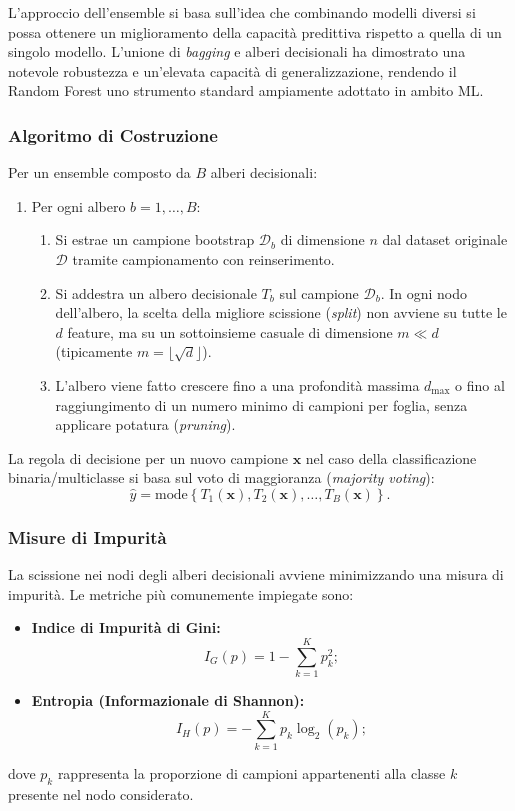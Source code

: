 L'approccio dell'ensemble si basa sull'idea che combinando modelli diversi si possa ottenere un miglioramento della capacità predittiva rispetto a quella di un singolo modello. L'unione di \textit{bagging} e alberi decisionali ha dimostrato una notevole robustezza e un'elevata capacità di generalizzazione, rendendo il Random Forest uno strumento standard ampiamente adottato in ambito ML.

\subsubsection{Algoritmo di Costruzione}
Per un ensemble composto da $B$ alberi decisionali:
\begin{enumerate}
    \item Per ogni albero $b = 1, \dots, B$:
    \begin{enumerate}
        \item Si estrae un campione bootstrap $\mathcal{D}_b$ di dimensione $n$ dal dataset originale $\mathcal{D}$ tramite campionamento con reinserimento.
        \item Si addestra un albero decisionale $T_b$ sul campione $\mathcal{D}_b$. In ogni nodo dell'albero, la scelta della migliore scissione (\textit{split}) non avviene su tutte le $d$ feature, ma su un sottoinsieme casuale di dimensione $m \ll d$ (tipicamente $m = \lfloor\sqrt{d}\rfloor$).
        \item L'albero viene fatto crescere fino a una profondità massima $d_{\max}$ o fino al raggiungimento di un numero minimo di campioni per foglia, senza applicare potatura (\textit{pruning}).
    \end{enumerate}
\end{enumerate}

La regola di decisione per un nuovo campione $\mathbf{x}$ nel caso della classificazione binaria/multiclasse si basa sul voto di maggioranza (\textit{majority voting}):
\begin{equation}
\hat{y} = \text{mode} \left\{ T_1(\mathbf{x}), T_2(\mathbf{x}), \dots, T_B(\mathbf{x}) \right\}.
\end{equation}

\subsubsection{Misure di Impurità}
La scissione nei nodi degli alberi decisionali avviene minimizzando una misura di impurità. Le metriche più comunemente impiegate sono:
\begin{itemize}
    \item \textbf{Indice di Impurità di Gini:}
    \begin{equation}
    I_G(p) = 1 - \sum_{k=1}^{K} p_k^2;
    \end{equation}
    \item \textbf{Entropia (Informazionale di Shannon):}
    \begin{equation}
    I_H(p) = -\sum_{k=1}^{K} p_k \log_2(p_k);
    \end{equation}
\end{itemize}
dove $p_k$ rappresenta la proporzione di campioni appartenenti alla classe $k$ presente nel nodo considerato.

